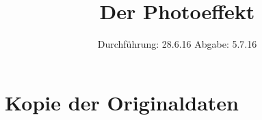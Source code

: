 

\subject{V 500}
\title{Der Photoeffekt}
\date{
  Durchführung: 28.6.16
  \hspace{3em}
  Abgabe: 5.7.16
}



\maketitle
\thispagestyle{empty}
\tableofcontents
\newpage






\printbibliography

\appendix
\section{Kopie der Originaldaten}


